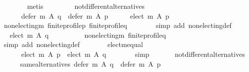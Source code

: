 \begin{isabellebody}
\ \ \ \ \ \ \isamarkupfalse%
\ metis\isanewline
\ \ \isamarkupfalse%
\isanewline
\ \ \ \ \isamarkupfalse%
\ not{\isacharunderscore}{\kern0pt}different{\isacharunderscore}{\kern0pt}alternatives{\isacharcolon}{\kern0pt}\isanewline
\ \ \ \ \ \ {\isachardoublequoteopen}{\isasymnot}{\isacharparenleft}{\kern0pt}defer\ m\ A\ q\ {\isasymnoteq}\ defer\ m\ A\ p{\isacharparenright}{\kern0pt}{\isachardoublequoteclose}\isanewline
\ \ \ \ \isamarkupfalse%
\ {\isachardoublequoteopen}elect\ m\ A\ p\ {\isacharequal}{\kern0pt}\ {\isacharbraceleft}{\kern0pt}{\isacharbraceright}{\kern0pt}{\isachardoublequoteclose}\isanewline
\ \ \ \ \ \ \isamarkupfalse%
\ non{\isacharunderscore}{\kern0pt}electing{\isacharunderscore}{\kern0pt}m\ finite{\isacharunderscore}{\kern0pt}profile{\isacharunderscore}{\kern0pt}p\ finite{\isacharunderscore}{\kern0pt}profile{\isacharunderscore}{\kern0pt}q\isanewline
\ \ \ \ \ \ \isamarkupfalse%
\ {\isacharparenleft}{\kern0pt}simp\ add{\isacharcolon}{\kern0pt}\ non{\isacharunderscore}{\kern0pt}electing{\isacharunderscore}{\kern0pt}def{\isacharparenright}{\kern0pt}\isanewline
\ \ \ \ \isamarkupfalse%
\ \isamarkupfalse%
\ {\isachardoublequoteopen}elect\ m\ A\ q\ {\isacharequal}{\kern0pt}\ {\isacharbraceleft}{\kern0pt}{\isacharbraceright}{\kern0pt}{\isachardoublequoteclose}\isanewline
\ \ \ \ \ \ \isamarkupfalse%
\ non{\isacharunderscore}{\kern0pt}electing{\isacharunderscore}{\kern0pt}m\ finite{\isacharunderscore}{\kern0pt}profile{\isacharunderscore}{\kern0pt}q\isanewline
\ \ \ \ \ \ \isamarkupfalse%
\ {\isacharparenleft}{\kern0pt}simp\ add{\isacharcolon}{\kern0pt}\ non{\isacharunderscore}{\kern0pt}electing{\isacharunderscore}{\kern0pt}def{\isacharparenright}{\kern0pt}\isanewline
\ \ \ \ \isamarkupfalse%
\ \isamarkupfalse%
\ elect{\isacharunderscore}{\kern0pt}m{\isacharunderscore}{\kern0pt}equal{\isacharcolon}{\kern0pt}\isanewline
\ \ \ \ \ \ {\isachardoublequoteopen}elect\ m\ A\ p\ {\isacharequal}{\kern0pt}\ elect\ m\ A\ q{\isachardoublequoteclose}\isanewline
\ \ \ \ \ \ \isamarkupfalse%
\ simp\ \isanewline
\ \ \ \ \isamarkupfalse%
\ not{\isacharunderscore}{\kern0pt}different{\isacharunderscore}{\kern0pt}alternatives\isanewline
\ \ \ \ \isamarkupfalse%
\ same{\isacharunderscore}{\kern0pt}alternatives{\isacharcolon}{\kern0pt}\ {\isachardoublequoteopen}defer\ m\ A\ q\ {\isacharequal}{\kern0pt}\ defer\ m\ A\ p{\isachardoublequoteclose}\isanewline

\end{isabellebody}
